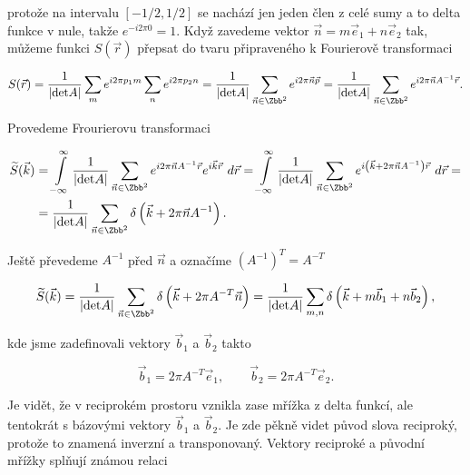 protože na intervalu $[-1/2,1/2]$ se nachází jen jeden člen z celé sumy a to delta funkce v nule, takže $e^{-i 2 \pi 0} = 1$. Když zavedeme vektor $\vec{n} = m\vec{e}_1 + n\vec{e}_2$ tak, můžeme funkci $S(\vec{r})$ přepsat do tvaru připraveného k Fourierově transformaci

\begin{equation}	
S(\vec{r}) = \frac{1}{|{\rm det}A|} \sum\limits_{m} e^{i 2 \pi p_1 m} \sum\limits_{n}  e^{i 2 \pi p_2 n} = \frac{1}{|{\rm det}A|} \sum\limits_{\vec{n}\in \Zbb^2} e^{i 2 \pi \vec{n} \vec{p}} = \frac{1}{|{\rm det}A|} \sum\limits_{\vec{n}\in \Zbb^2} e^{i 2 \pi \vec{n} A^{-1} \vec{r}}.
\end{equation}

Provedeme Frourierovu transformaci

\begin{equation}
\begin{aligned}
\widetilde{S}(\vec{k}) & = \int\limits_{-\infty}^{\infty} \frac{1}{|{\rm det}A|} \sum\limits_{\vec{n}\in \Zbb^2} e^{i 2 \pi \vec{n} A^{-1} \vec{r}} e^{i \vec{k}\vec{r}} ~ d\vec{r} = \int\limits_{-\infty}^{\infty} \frac{1}{|{\rm det}A|} \sum\limits_{\vec{n}\in \Zbb^2} e^{i\left(\vec{k} + 2 \pi \vec{n} A^{-1}\right)\vec{r}} ~ d\vec{r} = \\
& = \frac{1}{|{\rm det}A|} \sum\limits_{\vec{n}\in \Zbb^2} \delta \left(\vec{k} + 2 \pi \vec{n} A^{-1}\right).
\end{aligned}
\end{equation}

Ještě převedeme $A^{-1}$ před $\vec{n}$ a označíme $\left(A^{-1}\right)^T = A^{-T}$

\begin{equation}\label{eq:fourier_delta}
\widetilde{S}(\vec{k}) = \frac{1}{|{\rm det}A|} \sum\limits_{\vec{n}\in \Zbb^2} \delta \left(\vec{k} + 2 \pi A^{-T} \vec{n}\right) = \frac{1}{|{\rm det}A|} \sum\limits_{m,n} \delta \left(\vec{k} + m \vec{b}_1 + n \vec{b}_2 \right),
\end{equation}

kde jsme zadefinovali vektory $\vec{b}_1$ a $\vec{b}_2$ takto

\begin{equation}
\vec{b}_1 = 2 \pi A^{-T} \vec{e}_1, \qquad \vec{b}_2 = 2 \pi A^{-T} \vec{e}_2.
\end{equation}

Je vidět, že v reciprokém prostoru vznikla zase mřížka z delta funkcí, ale tentokrát s bázovými vektory $\vec{b}_1$ a $\vec{b}_2$. Je zde pěkně videt původ slova reciproký, protože to znamená inverzní a transponovaný. Vektory reciproké a původní mřížky splňují známou relaci 

